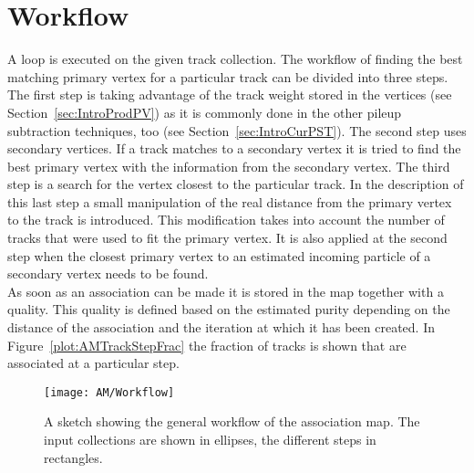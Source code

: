 \section{Workflow \label{sec:AMWorkflow}}

A loop is executed on the given track collection. The workflow of finding the best matching primary vertex for a particular track can be divided into three steps. The first step is taking advantage of the track weight stored in the vertices (see Section~\ref{sec:IntroProdPV}) as it is commonly done in the other pileup subtraction techniques, too (see Section~\ref{sec:IntroCurPST}). The second step uses secondary vertices. If a track matches to a secondary vertex it is tried to find the best primary vertex with the information from the secondary vertex. The third step is a search for the vertex closest to the particular track. In the description of this last step a small manipulation of the real distance from the primary vertex to the track is introduced. This modification takes into account the number of tracks that were used to fit the primary vertex. It is also applied at the second step when the closest primary vertex to an estimated incoming particle of a secondary vertex needs to be found. \\
As soon as an association can be made it is stored in the map together with a quality. This quality is defined based on the estimated purity depending on the distance of the association and the iteration at which it has been created. In Figure~\ref{plot:AMTrackStepFrac} the fraction of tracks is shown that are associated at a particular step.

\begin{figure}[!ht]
  \centering
  \texttt{[image: AM/Workflow]}
  \caption[Sketch of the workflow of the association map]{A sketch showing the general workflow of the association map. The input collections are shown in ellipses, the different steps in rectangles. \label{plot:AMWorkSketch}}
\end{figure}

